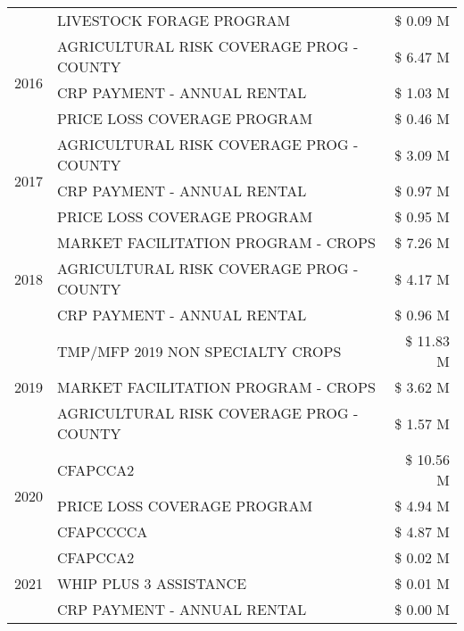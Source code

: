 \begin{tabular}{llr}
 & LIVESTOCK FORAGE PROGRAM & \$ 0.09 M \\
\cline{1-3}
\multirow[t]{3}{*}{2016} & AGRICULTURAL RISK COVERAGE PROG - COUNTY & \$ 6.47 M \\
 & CRP PAYMENT - ANNUAL RENTAL & \$ 1.03 M \\
 & PRICE LOSS COVERAGE PROGRAM & \$ 0.46 M \\
\cline{1-3}
\multirow[t]{3}{*}{2017} & AGRICULTURAL RISK COVERAGE PROG - COUNTY & \$ 3.09 M \\
 & CRP PAYMENT - ANNUAL RENTAL & \$ 0.97 M \\
 & PRICE LOSS COVERAGE PROGRAM & \$ 0.95 M \\
\cline{1-3}
\multirow[t]{3}{*}{2018} & MARKET FACILITATION PROGRAM - CROPS & \$ 7.26 M \\
 & AGRICULTURAL RISK COVERAGE PROG - COUNTY & \$ 4.17 M \\
 & CRP PAYMENT - ANNUAL RENTAL & \$ 0.96 M \\
\cline{1-3}
\multirow[t]{3}{*}{2019} & TMP/MFP 2019 NON SPECIALTY CROPS & \$ 11.83 M \\
 & MARKET FACILITATION PROGRAM - CROPS & \$ 3.62 M \\
 & AGRICULTURAL RISK COVERAGE PROG - COUNTY & \$ 1.57 M \\
\cline{1-3}
\multirow[t]{3}{*}{2020} & CFAPCCA2 & \$ 10.56 M \\
 & PRICE LOSS COVERAGE PROGRAM & \$ 4.94 M \\
 & CFAPCCCCA & \$ 4.87 M \\
\cline{1-3}
\multirow[t]{3}{*}{2021} & CFAPCCA2 & \$ 0.02 M \\
 & WHIP PLUS 3 ASSISTANCE & \$ 0.01 M \\
 & CRP PAYMENT - ANNUAL RENTAL & \$ 0.00 M \\
\cline{1-3}
\bottomrule
\end{tabular}
